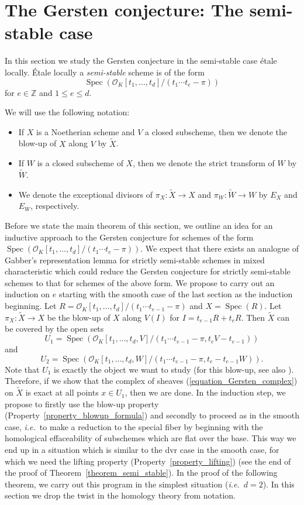 \documentclass[10pt,a4paper]{article}
\numberwithin{equation}{section}
\newtheorem{Key lemma}[theorem]{Key lemma}
\theoremstyle{definition}
\theoremstyle{remark}
\newcommand{\bb}{\mathbb}
\newcommand{\roi}{\mathcal{O}}
\renewcommand{\tilde}{\widetilde}
\DeclareMathOperator{\Spec}{Spec}
\begin{document}
\section{The Gersten conjecture: The semi-stable case}\label{section_semi_stable_case}

In this section we study the Gersten conjecture in the semi-stable case \'etale locally. \'Etale locally a \textit{semi-stable} scheme is of the form 
$$\Spec(\roi_K[t_1,\ldots,t_d]/(t_1\cdots t_{e}-\pi))$$
for $e\in \bb Z$ and $1\leq e\leq d$.

We will use the following notation:
\begin{itemize}
\item If $X$ is a Noetherian scheme and $V$ a closed subscheme, then we denote the blow-up of $X$ along $V$ by $\tilde{X}$.
\item If $W$ is a closed subscheme of $X$, then we denote the strict transform of $W$ by $\tilde{W}$.
\item We denote the exceptional divisors of $\pi_X\colon\tilde{X}\to X$ and $\pi_W\colon\tilde{W}\to W$ by $E_X$ and $E_W$, respectively. 
\end{itemize}

Before we state the main theorem of this section, we outline an idea for an inductive approach to the Gersten conjecture for schemes of the form $\Spec(\roi_K[t_1,\ldots,t_d]/(t_1\cdots t_{e}-\pi))$. We expect that there exists an analogue of Gabber's representation lemma for strictly semi-stable schemes in mixed characteristic which could reduce the Gersten conjecture for strictly semi-stable schemes to that for schemes of the above form. We propose to carry out an induction on $e$ starting with the smooth case of the last section as the induction beginning. Let $R=\roi_K[t_1,\ldots,t_d]/(t_1\cdots t_{e-1}-\pi)$ and $X=\Spec(R)$. Let $\pi_X\colon\tilde{X}\to X$ be the blow-up of $X$ along $V(I)$ for $I=t_{e-1}R+t_eR$. Then $\tilde{X}$ can be covered by the open sets
$$U_1=\Spec(\roi_K[t_1,\ldots,t_d,V]/(t_1\cdots t_{e-1}-\pi,t_eV-t_{e-1}))$$
and
$$U_2=\Spec(\roi_K[t_1,\ldots,t_d,W]/(t_1\cdots t_{e-1}-\pi,t_e-t_{e-1}W)).$$
Note that $U_1$ is exactly the object we want to study (for this blow-up, see also \cite[Section~3]{Hyodo1988}). Therefore, if we show that the complex of sheaves (\ref{equation_Gersten_complex}) on $\tilde{X}$ is exact at all points $x\in U_1$, then we are done. In the induction step, we propose to firstly use the blow-up property (Property~\ref{property_blowup_formula}) and secondly to proceed as in the smooth case, \textit{i.e.}~to make a reduction to the special fiber by beginning with the homological effaceability of subschemes which are flat over the base. This way we end up in a situation which is similar to the dvr case in the smooth case, for which we need the lifting property (Property~\ref{property_lifting}) (see the end of the proof of Theorem~\ref{theorem_semi_stable}).
In the proof of the following theorem, we carry out this program in the simplest situation (\textit{i.e.}~$d=2$).
In this section we drop the twist in the homology theory from notation. 
\end{document}
